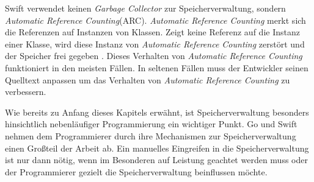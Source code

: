 Swift verwendet keinen \textit{Garbage Collector} zur Speicherverwaltung, sondern \textit{Automatic Reference Counting}(ARC).
\textit{Automatic Reference Counting} merkt sich die Referenzen auf Instanzen von Klassen.
Zeigt keine Referenz auf die Instanz einer Klasse, wird diese Instanz von \textit{Automatic Reference Counting} zerstört und der Speicher frei gegeben \cite[S.137]{Hoffman.2017}. 
Dieses Verhalten von \textit{Automatic Reference Counting} funktioniert in den meisten Fällen.
In seltenen Fällen muss der Entwickler seinen Quelltext anpassen um das Verhalten von \textit{Automatic Reference Counting} zu verbessern.

Wie bereits zu Anfang dieses Kapitels erwähnt, ist Speicherverwaltung besonders hinsichtlich nebenläufiger Programmierung ein wichtiger Punkt.
Go und Swift nehmen dem Programmierer durch ihre Mechanismen zur Speicherverwaltung einen Großteil der Arbeit ab. 
Ein manuelles Eingreifen in die Speicherverwaltung ist nur dann nötig, wenn im Besonderen auf Leistung geachtet werden muss oder der Programmierer gezielt die Speicherverwaltung beinflussen möchte.

